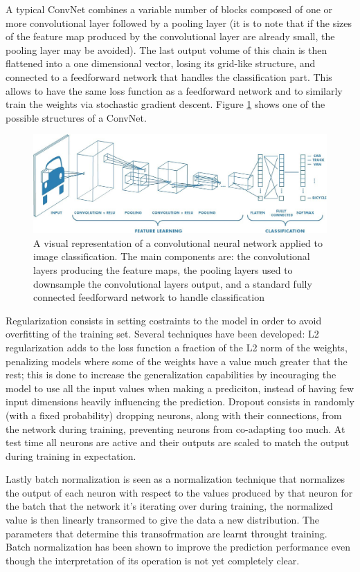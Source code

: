 \documentclass[12pt]{article}
\begin{document}
A typical ConvNet combines a variable number of blocks composed of one or more convolutional layer followed by a pooling layer (it is to note that if the sizes of the feature map produced by the convolutional layer are already small, the pooling layer may be avoided). The last output volume of this chain is then flattened into a one dimensional vector, losing its grid-like structure, and connected to a feedforward network that handles the classification part. This allows to have the same loss function as a feedforward network and to similarly train the weights via stochastic gradient descent. Figure \ref{fig:cnn} shows one of the possible structures of a ConvNet. 

\begin{figure}[h]
	\centering
	\includegraphics[width=\textwidth]{cnn}
	\caption{A visual representation of a convolutional neural network applied to image classification. The main components are: the convolutional layers producing the feature maps, the pooling layers used to downsample the convolutional layers output, and a standard fully connected feedforward network to handle classification}
	\label{fig:cnn}
\end{figure}

Regularization consists in setting costraints to the model in order to avoid overfitting of the training set. Several techniques have been developed: L2 regularization adds to the loss function a fraction of the L2 norm of the weights, penalizing models where some of the weights have a value much greater that the rest; this is done to increase the generalization capabilities by incouraging the model to use all the input values when making a prediciton, instead of having few input dimensions heavily influencing the prediction.
Dropout	consists in randomly (with a fixed probability) dropping neurons, along with their connections, from the network during training, preventing neurons from co-adapting too much. At test time all neurons are active and their outputs are scaled to match the output during training in expectation.

Lastly batch normalization is seen as a normalization technique that normalizes the output of each neuron with respect to the values produced by that neuron for the batch that the network it's iterating over during training, the normalized value is then linearly transormed to give the data a new distribution. The parameters that determine this transofrmation are learnt throught training. Batch normalization has been shown to improve the prediction performance even though the interpretation of its operation is not yet completely clear.
\end{document}
